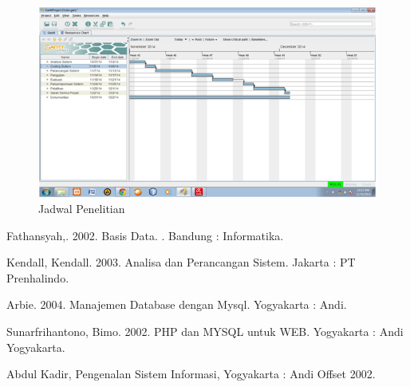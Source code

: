 \documentclass{jtetiproposalskripsi}
\begin{document}
\begin{figure}[h]
\centering 
 \includegraphics[width=1\textwidth]{gambar/buxxx.png}  
 \caption{Jadwal Penelitian}
\end{figure}
 

\begin{thebibliography}{9}

Fathansyah,. 2002. Basis Data. . Bandung :  Informatika.

Kendall,  Kendall.  2003.  Analisa  dan  Perancangan  Sistem.  Jakarta  :   PT 
Prenhalindo.

Arbie. 2004. Manajemen Database dengan Mysql. Yogyakarta : Andi.

Sunarfrihantono, Bimo. 2002.  PHP dan MYSQL untuk WEB. Yogyakarta : Andi 
Yogyakarta.

Abdul Kadir,  Pengenalan Sistem Informasi, Yogyakarta : Andi Offset 2002.

\end{thebibliography}
\end{document}
